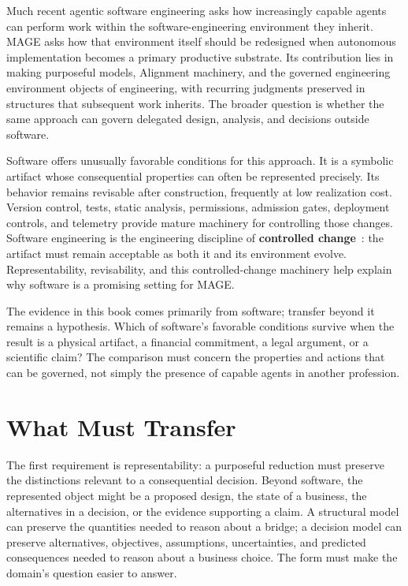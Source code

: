 Much recent agentic software engineering asks how increasingly capable agents can perform work within the software-engineering environment they inherit. MAGE asks how that environment itself should be redesigned when autonomous implementation becomes a primary productive substrate. Its contribution lies in making purposeful models, Alignment machinery, and the governed engineering environment objects of engineering, with recurring judgments preserved in structures that subsequent work inherits. The broader question is whether the same approach can govern delegated design, analysis, and decisions outside software.

Software offers unusually favorable conditions for this approach. It is a symbolic artifact whose consequential properties can often be represented precisely. Its behavior remains revisable after construction, frequently at low realization cost. Version control, tests, static analysis, permissions, admission gates, deployment controls, and telemetry provide mature machinery for controlling those changes. Software engineering is the engineering discipline of \textbf{controlled change}~\citep{davis2026sehandbook}: the artifact must remain acceptable as both it and its environment evolve. Representability, revisability, and this controlled-change machinery help explain why software is a promising setting for MAGE.

The evidence in this book comes primarily from software; transfer beyond it remains a hypothesis. Which of software's favorable conditions survive when the result is a physical artifact, a financial commitment, a legal argument, or a scientific claim? The comparison must concern the properties and actions that can be governed, not simply the presence of capable agents in another profession.

\section{What Must Transfer}\label{heading:what-must-transfer}

The first requirement is representability: a purposeful reduction must preserve the distinctions relevant to a consequential decision. Beyond software, the represented object might be a proposed design, the state of a business, the alternatives in a decision, or the evidence supporting a claim. A structural model can preserve the quantities needed to reason about a bridge; a decision model can preserve alternatives, objectives, assumptions, uncertainties, and predicted consequences needed to reason about a business choice. The form must make the domain's question easier to answer.


